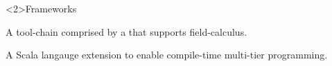 \begin{frame}<2>{Frameworks}
  \begin{card}
    A tool-chain comprised by a  that supports field-calculus.
  \end{card}
  \pause
  \begin{card}
    A Scala langauge extension to enable compile-time multi-tier programming.
  \end{card}
\end{frame}